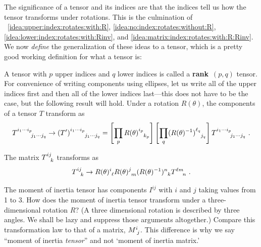 \documentclass[12pt]{article}
\begin{document}
The significance of a tensor and its indices are that the indices tell us how the tensor transforms under rotations. This is the culmination of \bigidearefs~\ref{idea:upper:index:rotates:with:R}, \ref{idea:no:index:rotates:without:R}, \ref{idea:lower:index:rotates:with:Rinv}, and \ref{idea:matrix:index:rotates:with:R:Rinv}. We now \emph{define} the generalization of these ideas to a tensor, which is a pretty good working definition for what a tensor is:
\begin{bigidea}\label{idea:tensor:rotation}
A tensor with $p$ upper indices and $q$ lower indices is called a \textbf{rank}~$(p,q)$ tensor. For convenience of writing components using ellipses, let us write all of the upper indices first and then all of the lower indices last---this does not have to be the case, but the following result will hold. Under a rotation $R(\theta)$, the components of a tensor $T$ transform as
\begin{align}
    T^{i_1\cdots i_p}_{\phantom{i_1\cdots i_p}j_1\cdots j_q} \to 
    (T')^{i_1\cdots i_p}_{\phantom{i_1\cdots i_p}j_1\cdots j_q}
    = 
    \left[\prod_{p}
            R(\theta)\aij{i_p}{k_p}\right]
    \left[\prod_{q}
            (R(\theta)\inv)\aij{\ell_q}{j_q}\right]
    T^{i_1\cdots i_p}_{\phantom{i_1\cdots i_p}j_1\cdots j_q}  \ .
    \label{eq:transformation:of:tensor}
\end{align}
\end{bigidea}
\begin{example}
The matrix $T\aij{ij}{k}$ transforms as
\begin{align}
    T\aij{ij}{k} \to 
    R(\theta)\aij{i}{\ell}
    R(\theta)\aij{j}{m}
    (R(\theta)\inv)\aij{n}{k}
    T\aij{\ell m}{n} \ .
\end{align}
\end{example}

\begin{exercise}
The moment of inertia tensor has components $I^{ij}$ with $i$ and $j$ taking values from 1 to 3. How does the moment of inertia tensor transform under a three-dimensional rotation $R$? (A three dimensional rotation is described by three angles. We shall be lazy and suppress those arguments altogether.) Compare this transformation law to that of a matrix, $M\aij{i}{j}$. This difference is why we say ``moment of inertia \emph{tensor}'' and not `moment of inertia matrix.'
\end{exercise}
\end{document}
